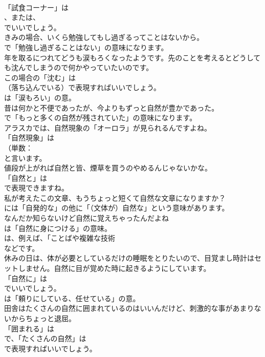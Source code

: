 \documentclass[8pt]{extreport}
\begin{document}
\begin{CJK}{UTF8}{min}
\\	「試食コーナー」は
\\	、または、
\\	でいいでしょう。	
\\	きみの場合、いくら勉強してもし過ぎるってことはないから。 
\\	で「勉強し過ぎることはない」の意味になります。	
\\	年を取るにつれてどうも涙もろくなったようです。先のことを考えるとどうしても沈んでしまうので何かやっていたいのです。 
\\	この場合の「沈む」は 
\\	（落ち込んでいる）で表現すればいいでしょう。
\\	は「涙もろい」の意。	
\\	昔は何かと不便であったが、今よりもずっと自然が豊かであった。 
\\	で「もっと多くの自然が残されていた」の意味になります。	
\\	アラスカでは、自然現象の「オーロラ」が見られるんですよね。 
\\	「自然現象」は
\\	（単数：
\\	と言います。	
\\	値段が上がれば自然と皆、煙草を買うのやめるんじゃないかな。 
\\	「自然と」は
\\	で表現できますね。	
\\	私が考えたこの文章、もうちょっと短くて自然な文章になりますか？ 
\\	には「自発的な」の他に「（文体が）自然な」という意味があります。	
\\	なんだか知らないけど自然に覚えちゃったんだよね 
\\	は「自然に身につける」の意味。
\\	は、例えば、「ことばや複雑な技術
\\	などです。	
\\	休みの日は、体が必要としているだけの睡眠をとりたいので、目覚まし時計はセットしません。自然に目が覚めた時に起きるようにしています。 
\\	「自然に」は
\\	でいいでしょう。
\\	は「頼りにしている、任せている」の意。	
\\	田舎はたくさんの自然に囲まれているのはいいんだけど、刺激的な事があまりないからちょっと退屈。 
\\	「囲まれる」は
\\	で、「たくさんの自然」は
\\	で表現すればいいでしょう。

\end{CJK}
\end{document}
